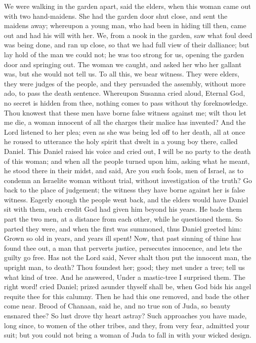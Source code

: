 {{We were walking in the garden apart, said the elders, when this woman came out with two hand-maidens. She had the garden door shut close, and sent the maidens away;
whereupon a young man, who had been in hiding till then, came out and had his will with her.
We, from a nook in the garden, saw what foul deed was being done, and ran up close, so that we had full view of their dalliance;
but lay hold of the man we could not; he was too strong for us, opening the garden door and springing out.
The woman we caught, and asked her who her gallant was, but she would not tell us. To all this, we bear witness.
They were elders, they were judges of the people, and they persuaded the assembly, without more ado, to pass the death sentence.
Whereupon Susanna cried aloud, Eternal God, no secret is hidden from thee, nothing comes to pass without thy foreknowledge.
Thou knowest that these men have borne false witness against me; wilt thou let me die, a woman innocent of all the charges their malice has invented?
And the Lord listened to her plea;
even as she was being led off to her death, all at once he roused to utterance the holy spirit that dwelt in a young boy there, called Daniel.
This Daniel raised his voice and cried out, I will be no party to the death of this woman;
and when all the people turned upon him, asking what he meant,
he stood there in their midst, and said, Are you such fools, men of Israel, as to condemn an Israelite woman without trial, without investigation of the truth?
Go back to the place of judgement; the witness they have borne against her is false witness.
Eagerly enough the people went back, and the elders would have Daniel sit with them, such credit God had given him beyond his years.
He bade them part the two men, at a distance from each other, while he questioned them.
So parted they were, and when the first was summoned, thus Daniel greeted him: Grown so old in years, and years ill spent! Now, that past sinning of thine has found thee out,
a man that perverts justice, persecutes innocence, and lets the guilty go free. Has not the Lord said, Never shalt thou put the innocent man, the upright man, to death?
Thou foundest her; good; they met under a tree; tell us what kind of tree. And he answered, Under a mastic-tree I surprised them.
The right word! cried Daniel; prized asunder thyself shall be, when God bids his angel requite thee for this calumny.
Then he had this one removed, and bade the other come near. Brood of Chanaan, said he, and no true son of Juda, so beauty ensnared thee? So lust drove thy heart astray?
Such approaches you have made, long since, to women of the other tribes, and they, from very fear, admitted your suit; but you could not bring a woman of Juda to fall in with your wicked design.
}}
